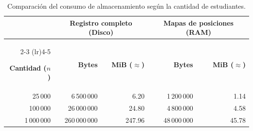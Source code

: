 \begin{table}[htbp]
\centering
\caption{Comparación del consumo de almacenamiento según la cantidad de estudiantes.}
\label{tab:comparacion_almacenamiento}
\vspace{0.5em}
\begin{tabular}{r r r r r}
\toprule
& \multicolumn{2}{c}{\textbf{Registro completo (Disco)}} 
& \multicolumn{2}{c}{\textbf{Mapas de posiciones (RAM)}} \\
\cmidrule(lr){2-3} \cmidrule(lr){4-5}

\textbf{Cantidad ($n$)} &
\textbf{Bytes} &
\textbf{MiB ($\approx$)} &
\textbf{Bytes} &
\textbf{MiB ($\approx$)} \\

\midrule
25\,000     &   6\,500\,000 &   6.20 &   1\,200\,000 &  1.14 \\
100\,000    &  26\,000\,000 &  24.80 &   4\,800\,000 &  4.58 \\
1\,000\,000 & 260\,000\,000 & 247.96 &  48\,000\,000 & 45.78 \\
\bottomrule
\end{tabular}
\end{table}
